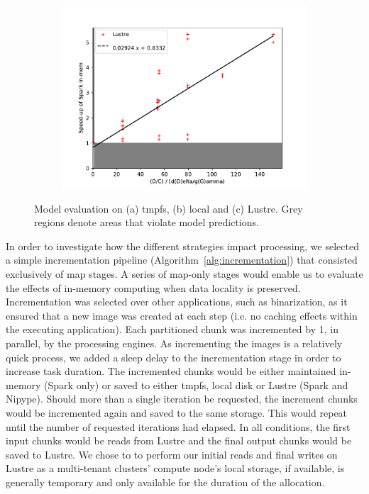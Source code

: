 \documentclass{IEEEtran}
\begin{document}
\begin{figure}
\begin{subfigure}{0.33\linewidth}
    \includegraphics[width=\textwidth]{results/figures/lustre-incrementation.pdf}
\caption{}
\label{fig:sub3}
\end{subfigure}
    \caption{Model evaluation on (a) tmpfs, (b) local and (c) Lustre. Grey 
             regions denote areas that violate model predictions.}
\label{fig:modeleval}
\end{figure}


In order to investigate how the different strategies impact processing, we 
selected a simple incrementation pipeline (Algorithm~\ref{alg:incrementation}) 
that consisted exclusively of map 
stages. A series of map-only stages would enable us to evaluate the effects of
in-memory computing when data locality is preserved. Incrementation was 
selected 
over other applications, such as binarization, as it ensured that a new image
was created at each step (i.e. no caching effects within the executing 
application). Each partitioned chunk was incremented by 1, in parallel, by
the processing engines. As incrementing the images is a relatively quick 
process, we added a sleep delay to the incrementation stage in order to 
increase task duration. The incremented chunks would be either 
maintained in-memory (Spark only) or saved to either tmpfs, local disk or 
Lustre (Spark and Nipype). Should more than a single iteration be requested, 
the increment chunks would be incremented again and saved to the same storage. 
This would repeat until the number of requested iterations had elapsed. In all 
conditions, the first input chunks would be reads from Lustre and the final 
output chunks would be saved to Lustre. We chose to to perform our initial 
reads and final writes on Lustre as a multi-tenant clusters' compute node's 
local storage, if 
available, is generally temporary and only available for the duration of the 
allocation. 
\end{document}
